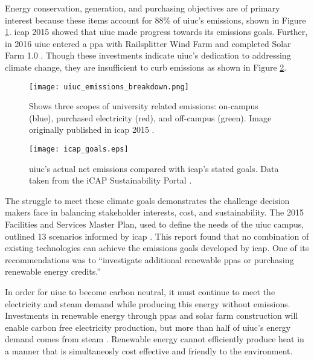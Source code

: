 Energy conservation, generation, and purchasing objectives are of primary
interest because these items account for 88\% of \gls{uiuc}'s emissions, shown
in Figure \ref{fig:uiuc_emissions_breakdown}. \gls{icap} 2015 showed that
\gls{uiuc} made progress towards its emissions goals. Further, in 2016
\gls{uiuc} entered a \gls{ppa} with Railsplitter Wind Farm
\cite{breitweiser_wind_2016} and completed Solar Farm 1.0
\cite{white_solar_2017}. Though these investments indicate \gls{uiuc}'s
dedication to addressing climate change, they are insufficient to curb
emissions as shown in Figure \ref{fig:uiuc_ghg}.

\begin{figure}[ht!]
  \centering
  \texttt{[image: uiuc\_emissions\_breakdown.png]}
  \caption{Shows three scopes of university related emissions: on-campus
  (blue), purchased electricity (red), and off-campus (green). Image originally
  published in \gls{icap} 2015 \cite{isee_illinois_2015}.}
  \label{fig:uiuc_emissions_breakdown}
\end{figure}

\begin{figure}[h]
  \centering
  \texttt{[image: icap\_goals.eps]}
  \caption{\gls{uiuc}'s actual net emissions compared with \gls{icap}'s
  stated goals. Data taken from the iCAP Sustainability Portal
  \cite{noauthor_metric_nodate}.}
    \label{fig:uiuc_ghg}
\end{figure}

The struggle to meet these climate goals demonstrates the challenge decision
makers face in balancing stakeholder interests, cost, and sustainability.
The 2015 Facilities and Services Master Plan, used to define the needs of the
\gls{uiuc} campus, outlined 13 scenarios informed by \gls{icap}
\cite{affiliated_engineers_inc_utilities_2015}. This report found that no
combination of existing technologies can achieve the emissions goals developed
by \gls{icap}. One of its recommendations was to ``investigate additional
renewable \glspl{ppa} or purchasing renewable energy credits.''

In order for \gls{uiuc} to become carbon neutral, it must continue to meet the
electricity and steam demand while producing this energy without emissions.
Investments in renewable energy through \glspl{ppa} and solar
farm construction will enable carbon free electricity production, but more than
half of \gls{uiuc}'s energy demand comes from steam \cite{isee_illinois_2015}
. Renewable energy cannot
efficiently produce heat in a manner that is simultaneosly cost effective and
friendly to the environment.

